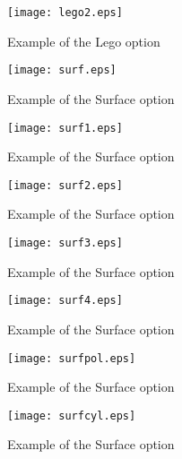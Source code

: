 \clearpage

\begin{figure}[p]
\begin{center}
\texttt{[image: lego2.eps]}
\end{center}
\caption{Example of the \protect{} Lego \protect{} option}
\label{LEGO2}
\begin{center}
\texttt{[image: surf.eps]}
\end{center}
\caption{Example of the \protect{} Surface option}
\label{SURF}
\end{figure}

\clearpage

\begin{figure}[p]
\begin{center}
\texttt{[image: surf1.eps]}
\end{center}
\caption{Example of the \protect{} Surface \protect{} option}
\label{SURF1}
\begin{center}
\texttt{[image: surf2.eps]}
\end{center}
\caption{Example of the \protect{} Surface \protect{} option}
\label{SURF2}
\end{figure}

\clearpage

\begin{figure}[p]
\begin{center}
\texttt{[image: surf3.eps]}
\end{center}
\caption{Example of the \protect{} Surface \protect{} option}
\label{SURF3}
\begin{center}
\texttt{[image: surf4.eps]}
\end{center}
\caption{Example of the \protect{} Surface \protect{} option}
\label{SURF4}
\end{figure}

\clearpage

\begin{figure}[p]
\begin{center}
\texttt{[image: surfpol.eps]}
\end{center}
\caption{Example of the \protect{} Surface \protect{} option}
\label{SPOL}
\begin{center}
\texttt{[image: surfcyl.eps]}
\end{center}
\caption{Example of the \protect{} Surface \protect{} option}
\label{SCYL}
\end{figure}

